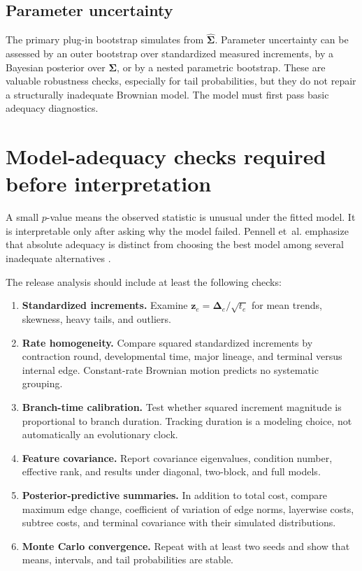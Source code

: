 \documentclass[10pt]{article}
\begin{document}
\subsection{Parameter uncertainty}

The primary plug-in bootstrap simulates from
$\widehat{\boldsymbol\Sigma}$.  Parameter uncertainty can be assessed by an
outer bootstrap over standardized measured increments, by a Bayesian posterior
over $\boldsymbol\Sigma$, or by a nested parametric bootstrap.  These are
valuable robustness checks, especially for tail probabilities, but they do not
repair a structurally inadequate Brownian model.  The model must first pass
basic adequacy diagnostics.

\section{Model-adequacy checks required before interpretation}

A small $p$-value means the observed statistic is unusual under the fitted
model.  It is interpretable only after asking why the model failed.  Pennell
et~al. emphasize that absolute adequacy is distinct from choosing the best
model among several inadequate alternatives \cite{pennell2015}.

The release analysis should include at least the following checks:

\begin{enumerate}
  \item \textbf{Standardized increments.} Examine
        $\mathbf{z}_e=\boldsymbol\Delta_e/\sqrt{t_e}$ for mean trends,
        skewness, heavy tails, and outliers.
  \item \textbf{Rate homogeneity.} Compare squared standardized increments by
        contraction round, developmental time, major lineage, and terminal
        versus internal edge.  Constant-rate Brownian motion predicts no
        systematic grouping.
  \item \textbf{Branch-time calibration.} Test whether squared increment
        magnitude is proportional to branch duration.  Tracking duration is a
        modeling choice, not automatically an evolutionary clock.
  \item \textbf{Feature covariance.} Report covariance eigenvalues, condition
        number, effective rank, and results under diagonal, two-block, and full
        models.
  \item \textbf{Posterior-predictive summaries.} In addition to total cost,
        compare maximum edge change, coefficient of variation of edge norms,
        layerwise costs, subtree costs, and terminal covariance with their
        simulated distributions.
  \item \textbf{Monte Carlo convergence.} Repeat with at least two seeds and
        show that means, intervals, and tail probabilities are stable.
\end{enumerate}
\end{document}
